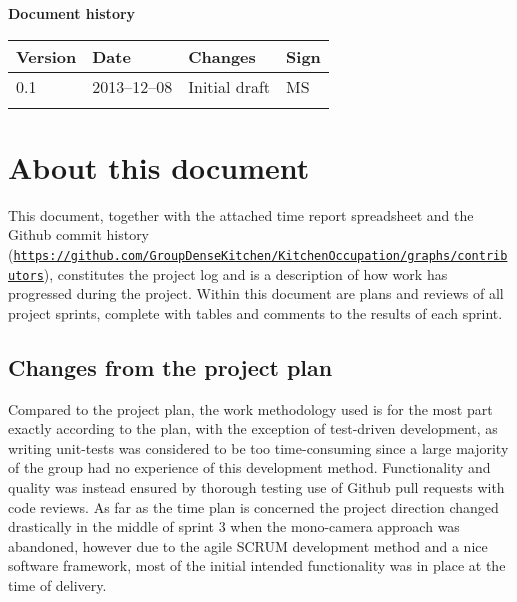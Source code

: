 \documentclass[10pt, a4paper, twoside]{article}
\begin{document}



\newpage
\pagestyle{fancy}
\setcounter{page}{2} %



\newpage
\tableofcontents
\listoffigures


\newpage
\vspace*{5\baselineskip}

\begin{center}
\textbf{\LARGE Document history}

{ \footnotesize 
\begin{tabular}{|p{1cm}|p{2.0cm}|p{6.5cm}|p{2cm}|}
	\hline
	\textbf{Version} & \textbf{Date} & \textbf{Changes} & \textbf{Sign} \\
	
	\hline
	0.1 & 2013--12--08 & Initial draft & MS \\
	\hline
	 &  &  &   \\
	
	\hline
\end{tabular}
}
\end{center}

\vspace{2cm}

\section{About this document}
\label{sec:about}
This document, together with the attached time report spreadsheet and the Github commit history (\href{https://github.com/GroupDenseKitchen/KitchenOccupation/graphs/contributors}{\texttt{https://github.com/GroupDenseKitchen/KitchenOccupation/graphs/contributors}}), constitutes the project log and is a description of how work has progressed during the project. Within this document are plans and reviews of all project sprints, complete with tables and comments to the results of each sprint.

\subsection{Changes from the project plan}
Compared to the project plan, the work methodology used is for the most part exactly according to the plan, with the exception of test-driven development, as writing unit-tests was considered to be too time-consuming since a large majority of the group had no experience of this development method. Functionality and quality was instead ensured by thorough testing use of Github pull requests with code reviews. As far as the time plan is concerned the project direction changed drastically in the middle of sprint 3 when the mono-camera approach was abandoned, however due to the agile SCRUM development method and a nice software framework, most of the initial intended functionality was in place at the time of delivery.
\end{document}
